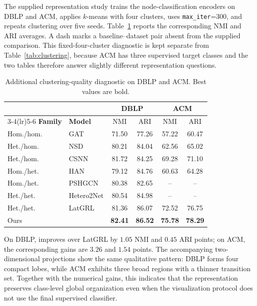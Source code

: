 The supplied representation study trains the node-classification encoders on DBLP and ACM, applies
$k$-means with four clusters, uses \texttt{max\_iter}=300, and repeats clustering over five seeds.
Table~\ref{tab:clustering-diagnostic} reports the corresponding NMI and ARI averages. A dash marks a
baseline--dataset pair absent from the supplied comparison. This fixed-four-cluster diagnostic is
kept separate from Table~\ref{tab:clustering}, because ACM has three supervised target classes and
the two tables therefore answer slightly different representation questions.

\begin{table}[H]
  \centering
  \caption{Additional clustering-quality diagnostic on DBLP and ACM. Best values are bold.}
  \label{tab:clustering-diagnostic}
  \small
  \begin{tabular}{llcccc}
    \toprule
    & & \multicolumn{2}{c}{DBLP} & \multicolumn{2}{c}{ACM} \\
    \cmidrule(lr){3-4}\cmidrule(lr){5-6}
    \textbf{Family} & \textbf{Model} & NMI & ARI & NMI & ARI \\
    \midrule
    Hom./hom. & GAT & 71.50 & 77.26 & 57.22 & 60.47 \\
    Het./hom. & NSD & 80.21 & 84.04 & 62.56 & 65.02 \\
    Het./hom. & CSNN & 81.72 & 84.25 & 69.28 & 71.10 \\
    Hom./het. & HAN & 79.12 & 84.76 & 60.63 & 64.28 \\
    Hom./het. & PSHGCN & 80.38 & 82.65 & -- & -- \\
    Het./het. & Hetero2Net & 80.54 & 84.98 & -- & -- \\
    Het./het. & LatGRL & 81.36 & 86.07 & 72.52 & 76.75 \\
    \midrule
    Ours & \textbf{\method{}} & \textbf{82.41} & \textbf{86.52} & \textbf{75.78} & \textbf{78.29} \\
    \bottomrule
  \end{tabular}
\end{table}

On DBLP, \method{} improves over LatGRL by $1.05$ NMI and $0.45$ ARI points; on ACM, the
corresponding gains are $3.26$ and $1.54$ points. The accompanying two-dimensional projections
show the same qualitative pattern: DBLP forms four compact lobes, while ACM exhibits three broad
regions with a thinner transition set. Together with the numerical gains, this indicates that the
representation preserves class-level global organization even when the visualization protocol
does not use the final supervised classifier.


